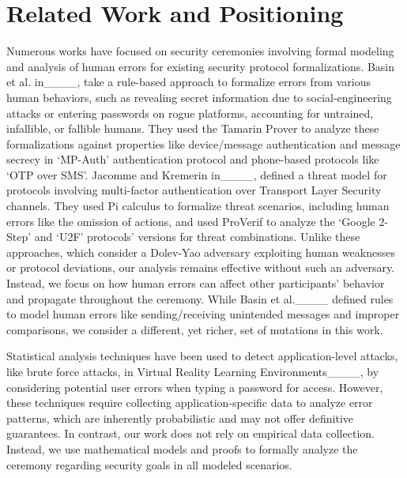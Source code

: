 \section{Related Work and Positioning}
\label{Sec:RelatedWork}

Numerous works have focused on security ceremonies involving formal modeling and analysis of human errors for existing security protocol formalizations. Basin et al. in____, take a rule-based approach to formalize errors from various human behaviors, such as revealing secret information due to social-engineering attacks or entering passwords on rogue platforms, accounting for untrained, infallible, or fallible humans. They used the Tamarin Prover to analyze these formalizations against properties like device/message authentication and message secrecy in `MP-Auth' authentication protocol and phone-based protocols like `OTP over SMS'. Jacomme and Kremerin in____, defined a threat model for protocols involving multi-factor authentication over Transport Layer Security channels. They used Pi calculus to formalize threat scenarios, including human errors like the omission of actions, and used ProVerif to analyze the `Google 2-Step' and `U2F' protocols' versions for threat combinations. Unlike these approaches, which consider a Dolev-Yao adversary exploiting human weaknesses or protocol deviations, our analysis remains effective without such an adversary. Instead, we focus on how human errors can affect other participants' behavior and propagate throughout the ceremony. While Basin et al.____ defined rules to model human errors like sending/receiving unintended messages and improper comparisons, we consider a different, yet richer, set of mutations in this work.

Statistical analysis techniques have been used to detect application-level attacks, like brute force attacks, in Virtual Reality Learning Environments____, by considering potential user errors when typing a password for access. However, these techniques require collecting application-specific data to analyze error patterns, which are inherently probabilistic and may not offer definitive guarantees. In contrast, our work does not rely on empirical data collection. Instead, we use mathematical models and proofs to formally analyze the ceremony regarding security goals in all modeled scenarios. 

